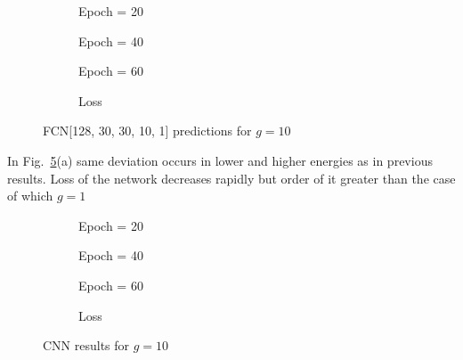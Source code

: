 \documentclass[a4paper,times,12pt]{article}
\begin{document}
\begin{figure}[H]
    \centering
    \begin{subfigure}[t]{0.45\textwidth}
		\centering
        
        \caption{Epoch = 20}
		\label{fig:a}
    \end{subfigure}
    \begin{subfigure}[t]{0.45\textwidth}
		\centering
        
        \caption{Epoch = 40}
		\label{fig:b}
    \end{subfigure}    
    \begin{subfigure}[t]{0.45\textwidth}
        \centering
        
        \caption{Epoch = 60}
		\label{fig:c}
    \end{subfigure}
    \begin{subfigure}[t]{0.45\textwidth}
        \centering
        
        \caption{Loss}
		\label{fig:c}
    \end{subfigure}
	\caption{FCN[128, 30, 30, 10, 1] predictions for $g = 10$}
\label{fig:FFN-g-10}
\end{figure}

In Fig.~\ref{fig:FFN-g-10}(a) same deviation occurs in lower and higher energies as in previous results. Loss of the network decreases rapidly but order of it greater than the case of which $g = 1$


\begin{figure}[H]
    \centering
    \begin{subfigure}[t]{0.45\textwidth}
		\centering
        
        \caption{Epoch = 20}
		\label{fig:a}
    \end{subfigure}
    \begin{subfigure}[t]{0.45\textwidth}
		\centering
        
        \caption{Epoch = 40}
		\label{fig:b}
    \end{subfigure}    
    \begin{subfigure}[t]{0.45\textwidth}
        \centering
        
        \caption{Epoch = 60}
		\label{fig:c}
    \end{subfigure}
    \begin{subfigure}[t]{0.45\textwidth}
        \centering
        
        \caption{Loss}
		\label{fig:c}
    \end{subfigure}
	\caption{CNN results for $g = 10$}
\label{fig:CNN-g-10}
\end{figure}
\end{document}
